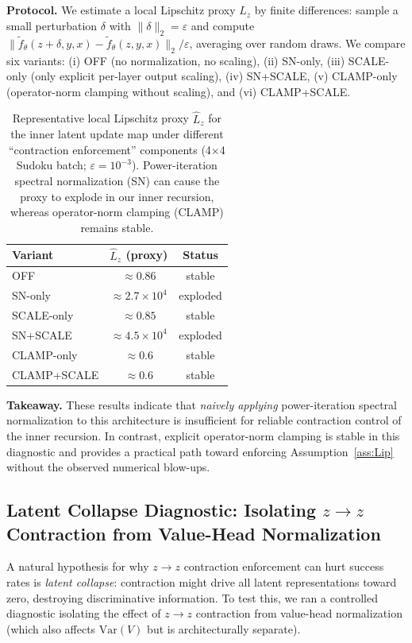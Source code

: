 \documentclass{article}
\theoremstyle{plain}
\theoremstyle{definition}
\theoremstyle{remark}
\begin{document}
\textbf{Protocol.}
We estimate a local Lipschitz proxy $\hat L_z$ by finite differences:
sample a small perturbation $\delta$ with $\|\delta\|_2=\varepsilon$ and compute
$\|\tilde f_\theta(z+\delta,y,x)-\tilde f_\theta(z,y,x)\|_2/\varepsilon$, averaging over random draws.
We compare six variants: (i) OFF (no normalization, no scaling), (ii) SN-only, (iii) SCALE-only (only explicit per-layer output scaling),
(iv) SN+SCALE, (v) CLAMP-only (operator-norm clamping without scaling), and (vi) CLAMP+SCALE.

\begin{table}[t]
\caption{Representative local Lipschitz proxy $\hat L_z$ for the inner latent update map under different ``contraction enforcement'' components (4$\times$4 Sudoku batch; $\varepsilon=10^{-3}$). Power-iteration spectral normalization (SN) can cause the proxy to explode in our inner recursion, whereas operator-norm clamping (CLAMP) remains stable.}
\label{tab:sn_instability}
\centering
\small
\begin{tabular}{@{}lcc@{}}
\toprule
Variant & $\hat L_z$ (proxy) & Status \\
\midrule
OFF & $\approx 0.86$ & stable \\
SN-only & $\approx 2.7\times 10^4$ & exploded \\
SCALE-only & $\approx 0.85$ & stable \\
SN+SCALE & $\approx 4.5\times 10^4$ & exploded \\
CLAMP-only & $\approx 0.6$ & stable \\
CLAMP+SCALE & $\approx 0.6$ & stable \\
\bottomrule
\end{tabular}
\end{table}

\textbf{Takeaway.}
These results indicate that \emph{naively applying} power-iteration spectral normalization to this architecture is insufficient for reliable contraction control of the inner recursion.
In contrast, explicit operator-norm clamping is stable in this diagnostic and provides a practical path toward enforcing Assumption~\ref{ass:Lip} without the observed numerical blow-ups.

\subsection{Latent Collapse Diagnostic: Isolating $z\!\to\!z$ Contraction from Value-Head Normalization}
\label{app:latent_collapse_diagnostic}

A natural hypothesis for why $z\!\to\!z$ contraction enforcement can hurt success rates is \emph{latent collapse}: contraction might drive all latent representations toward zero, destroying discriminative information.
To test this, we ran a controlled diagnostic isolating the effect of $z\!\to\!z$ contraction from value-head normalization (which also affects $\mathrm{Var}(V)$ but is architecturally separate).
\end{document}

